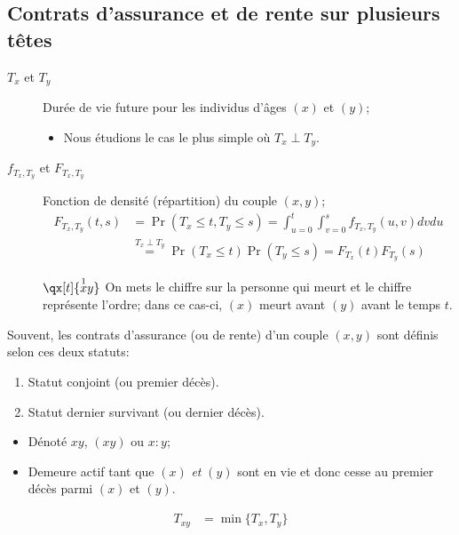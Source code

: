 \documentclass[10pt, french]{article}
\begin{document}
\begin{multicols*}{2}
\pagebreak

\section{Contrats d'assurance et de rente sur plusieurs têtes}
\begin{distributions}[Notation]
\begin{description}
	\item[$T_{x}$ et $T_{y}$]	Durée de vie future pour les individus d'âges $(x)$ et $(y)$;
		\begin{itemize}[leftmargin = *]
		\item	Nous étudions le cas le plus simple où $T_{x}	\perp	T_{y}$.
		\end{itemize}
	\item[$f_{T_{x}, T_{y}}$ et $F_{T_{x}, T_{y}}$]	Fonction de densité (répartition) du couple $(x, y)$;
		\begin{align*}
		F_{T_{x}, T_{y}}(t, s)
		&=	\Pr(T_{x}	\leq	t, T_{y}	\leq	s)	
		=	\int_{u = 0}^{t}\int_{v = 0}^{s} f_{T_{x}, T_{y}}(u, v) dvdu	\\
		&\overset{T_{x}\perp T_{y}}{=}	\Pr(T_{x}	\leq	t)\Pr(T_{y}	\leq	s)	
		=	F_{T_{x}}(t)F_{T_{y}}(s)
		\end{align*}
	\item[]	$\qx[t]{\overset{1}{x}y}$	On mets le chiffre sur la personne qui meurt et le chiffre représente l'ordre; dans ce cas-ci, $(x)$ meurt avant $(y)$ avant le temps $t$.
\end{description}
\end{distributions}

Souvent, les contrats d'assurance (ou de rente) d'un couple $(x, y)$ sont définis selon ces deux statuts:
\begin{enumerate}[leftmargin = *]
	\item	Statut conjoint (ou premier décès).
	\item	Statut dernier survivant (ou dernier décès).
\end{enumerate}

\begin{definitionNOHFILLsub}
\begin{itemize}[leftmargin = *]
	\item	Dénoté $xy$, $(xy)$ ou $x : y$;
	\item	Demeure actif tant que $(x)$ \textit{et} $(y)$ sont en vie et donc cesse au premier décès parmi $(x)$ et $(y)$.
\end{itemize}
\begin{align*}
	T_{xy}
	&=	\min\{T_{x}, T_{y}\}	
\end{align*}


\end{definitionNOHFILLsub}
\end{multicols*}
\end{document}
